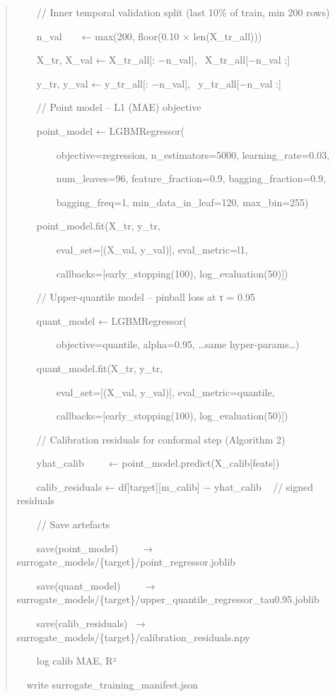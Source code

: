 \documentclass[11pt]{article}
\begin{document}
\begin{quote}
~~~~// Inner temporal validation split (last 10\% of train, min 200
rows)

~~~~n\_val ~ ~ ← max(200, floor(0.10 × len(X\_tr\_all)))

~~~~X\_tr, X\_val ← X\_tr\_all{[}: −n\_val{]},~ X\_tr\_all{[}−n\_val
:{]}

~~~~y\_tr, y\_val ← y\_tr\_all{[}: −n\_val{]},~ y\_tr\_all{[}−n\_val
:{]}

~~~~// Point model -- L1 (MAE) objective

~~~~point\_model ← LGBMRegressor(

~~~~~~~~objective=\textquotesingle regression\textquotesingle,
n\_estimators=5000, learning\_rate=0.03,

~~~~~~~~num\_leaves=96, feature\_fraction=0.9, bagging\_fraction=0.9,

~~~~~~~~bagging\_freq=1, min\_data\_in\_leaf=120, max\_bin=255)

~~~~point\_model.fit(X\_tr, y\_tr,

~~~~~~~~eval\_set={[}(X\_val, y\_val){]},
eval\_metric=\textquotesingle l1\textquotesingle,

~~~~~~~~callbacks={[}early\_stopping(100), log\_evaluation(50){]})

~~~~// Upper-quantile model -- pinball loss at τ = 0.95

~~~~quant\_model ← LGBMRegressor(

~~~~~~~~objective=\textquotesingle quantile\textquotesingle, alpha=0.95,
\ldots same hyper-params\ldots)

~~~~quant\_model.fit(X\_tr, y\_tr,

~~~~~~~~eval\_set={[}(X\_val, y\_val){]},
eval\_metric=\textquotesingle quantile\textquotesingle,

~~~~~~~~callbacks={[}early\_stopping(100), log\_evaluation(50){]})

~~~~// Calibration residuals for conformal step (Algorithm 2)

~~~~yhat\_calib~ ~ ~ ← point\_model.predict(X\_calib{[}feats{]})

~~~~calib\_residuals ← df{[}target{]}{[}m\_calib{]} − yhat\_calib ~ //
signed residuals

~~~~// Save artefacts

~~~~save(point\_model)~ ~ ~ →
surrogate\_models/\{target\}/point\_regressor.joblib

~~~~save(quant\_model)~ ~ ~ →
surrogate\_models/\{target\}/upper\_quantile\_regressor\_tau0.95.joblib

~~~~save(calib\_residuals)~ →
surrogate\_models/\{target\}/calibration\_residuals.npy

~~~~log calib MAE, R²

~~write surrogate\_training\_manifest.json
\end{quote}
\end{document}
